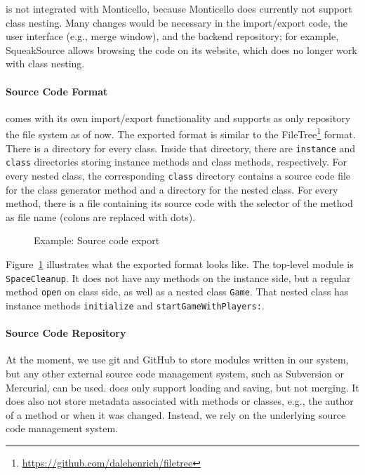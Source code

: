 \msname is not integrated with Monticello, because Monticello does currently not support class nesting. Many changes would be necessary in the import/export code, the user interface (e.g., merge window), and the backend repository; for example, SqueakSource allows browsing the code on its website, which does no longer work with class nesting.

\paragraph{Source Code Format}
\msname comes with its own import/export functionality and supports as only repository the file system as of now. The exported format is similar to the FileTree\footnote{\url{https://github.com/dalehenrich/filetree}} format. There is a directory for every class. Inside that directory, there are \texttt{instance} and \texttt{class} directories storing instance methods and class methods, respectively. For every nested class, the corresponding \texttt{class} directory contains a source code file for the class generator method and a directory for the nested class. For every method, there is a file containing its source code with the selector of the method as file name (colons are replaced with dots).

\begin{figure}[!htp]
\caption{Example: Source code export}
\label{fig:impl_source_export}
\end{figure}

Figure~\ref{fig:impl_source_export} illustrates what the exported format looks like. The top-level module is \texttt{SpaceCleanup}. It does not have any methods on the instance side, but a regular method \texttt{open} on class side, as well as a nested class \texttt{Game}. That nested class has instance methods \texttt{initialize} and \texttt{startGameWithPlayers:}.

\paragraph{Source Code Repository}
At the moment, we use git and GitHub to store modules written in our system, but any other external source code management system, such as Subversion or Mercurial, can be used. \msname does only support loading and saving, but not merging. It does also not store metadata associated with methods or classes, e.g., the author of a method or when it was changed. Instead, we rely on the underlying source code management system.

